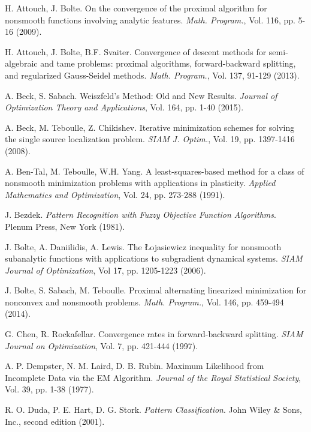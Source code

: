\documentclass[12pt,a4paper]{report}
\begin{document}
\begin{thebibliography}{99}

 H. Attouch, J. Bolte. On the convergence of the proximal algorithm for nonsmooth functions involving analytic features. \emph{Math. Program.}, Vol. 116, pp. 5-16 (2009).


  H. Attouch, J. Bolte, B.F. Svaiter. Convergence of descent methods for semi-algebraic and tame problems: proximal algorithms, forward-backward splitting, and regularized Gauss-Seidel methods. \emph{Math. Program.}, Vol. 137, 91-129 (2013).


 A. Beck, S. Sabach. Weiszfeld's Method: Old and New Results. \emph{Journal of Optimization Theory and Applications}, Vol. 164, pp. 1-40 (2015).


 A. Beck, M. Teboulle, Z. Chikishev. Iterative minimization schemes for solving the single source localization problem. \emph{SIAM J. Optim.}, Vol. 19, pp. 1397-1416 (2008).


 A. Ben-Tal, M. Teboulle, W.H. Yang. A least-squares-based method for a class of nonsmooth minimization problems with applications in plasticity.  \emph{Applied Mathematics and Optimization}, Vol. 24, pp. 273-288 (1991).


 J. Bezdek. \emph{Pattern Recognition with Fuzzy Objective Function Algorithms}. Plenum Press, New York (1981). 

 J. Bolte, A. Daniilidis, A. Lewis. The {\L}ojasiewicz inequality for nonsmooth subanalytic functions with applications to subgradient dynamical systems. \emph{SIAM Journal of Optimization}, Vol 17, pp. 1205-1223 (2006).


 J. Bolte, S. Sabach, M. Teboulle. Proximal alternating linearized minimization for nonconvex and nonsmooth problems. \emph{Math. Program.}, Vol. 146, pp. 459-494 (2014).


 G. Chen, R. Rockafellar. Convergence rates in forward-backward splitting. \emph{SIAM Journal on Optimization}, Vol. 7, pp. 421-444 (1997).


 A. P. Dempster, N. M. Laird, D. B. Rubin. Maximum Likelihood from Incomplete Data via the EM Algorithm. \emph{Journal of the Royal Statistical Society}, Vol. 39, pp. 1-38 (1977).


 R. O. Duda, P. E. Hart, D. G. Stork. \emph{Pattern Classification}. John Wiley \& Sons, Inc., second edition (2001).



\end{thebibliography}
\end{document}
